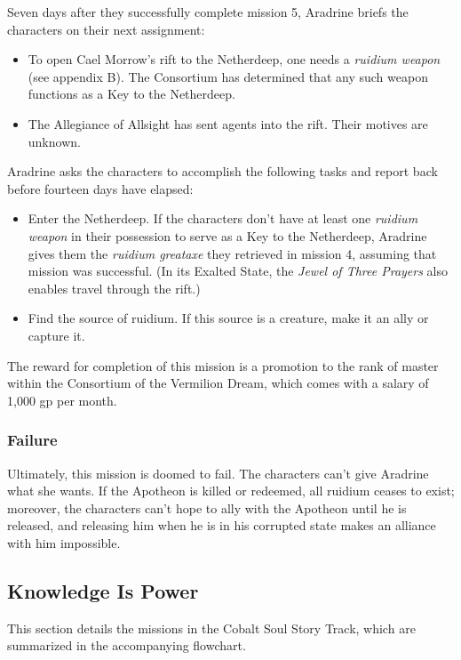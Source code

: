 \documentclass[10pt,a4paper,twoside,bg=print,twocolumn,openany,nodeprecatedcode]{dndbook}
\begin{document}
Seven days after they successfully complete mission 5, Aradrine briefs the characters on their next assignment:


\begin{itemize}
\item To open Cael Morrow's rift to the Netherdeep, one needs a \textit{ruidium weapon} (see appendix B). The Consortium has determined that any such weapon functions as a Key to the Netherdeep.
\item The Allegiance of Allsight has sent agents into the rift. Their motives are unknown.
\end{itemize}

Aradrine asks the characters to accomplish the following tasks and report back before fourteen days have elapsed:


\begin{itemize}
\item Enter the Netherdeep. If the characters don't have at least one \textit{ruidium weapon} in their possession to serve as a Key to the Netherdeep, Aradrine gives them the \textit{ruidium greataxe} they retrieved in mission 4, assuming that mission was successful. (In its Exalted State, the \textit{Jewel of Three Prayers} also enables travel through the rift.)
\item Find the source of ruidium. If this source is a creature, make it an ally or capture it.
\end{itemize}

The reward for completion of this mission is a promotion to the rank of master within the Consortium of the Vermilion Dream, which comes with a salary of 1,000 gp per month.

\subsubsection{Failure}
Ultimately, this mission is doomed to fail. The characters can't give Aradrine what she wants. If the Apotheon is killed or redeemed, all ruidium ceases to exist; moreover, the characters can't hope to ally with the Apotheon until he is released, and releasing him when he is in his corrupted state makes an alliance with him impossible.

\subsection{Knowledge Is Power}
This section details the missions in the Cobalt Soul Story Track, which are summarized in the accompanying flowchart.
\end{document}
